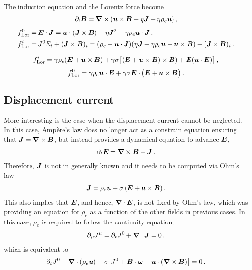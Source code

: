 \documentclass{article}
\begin{document}
The induction equation and the Lorentz force become
\begin{equation}
    \partial_t \BB = \nab \times (\uu \times \BB - \eta \JJ + \eta \rho_e \uu)\,,
\end{equation}
\begin{align}
    f_{\rm Lor}^0 = &\, \EE \cdot \JJ = \uu \cdot (\JJ \times \BB) +
    \eta \JJ^2 - \eta \rho_e \uu \cdot \JJ\,, \\ 
    f_{\rm Lor}^i = &\, J^0 E_i + (\JJ \times \BB)_i
    = (\rho_e + \uu \cdot \JJ) (\eta \JJ - \eta \rho_e \uu - \uu \times \BB)
    + (\JJ \times \BB)_i \,.
\end{align}

\begin{equation}
    f_{\rm Lor}^i = \gamma \rho_e 
    (\EE + \uu \times \BB) + \gamma \sigma \bigl[(\EE + \uu \times \BB) \times \BB ) + \EE (\uu \cdot \EE) \bigr]\,,
\end{equation}
\begin{equation}
    f_{\rm Lor}^0 = \gamma \rho_e \uu \cdot \EE + \gamma \sigma 
    \EE \cdot 
    \bigl(\EE + \uu \times \BB \bigr)\,.
\end{equation}

\subsection{Displacement current}

More interesting is the case when the displacement current cannot be neglected.
In this case, Amp\`ere's law does no longer act as a constrain equation ensuring
that $\JJ = \nab \times \BB$, but instead provides a dynamical equation
to advance $\EE$,
\begin{equation}
    \partial_t \EE = \nab \times \BB - \JJ\,.
\end{equation}
Therefore, $\JJ$ is not in generally known and it needs to be computed via Ohm's law
\begin{equation}
    \JJ = \rho_e \uu +  \sigma \, (\EE + \uu \times \BB)\,.
\end{equation}
This also implies that $\EE$, and hence, $\nab \cdot \EE$,
is not fixed by Ohm's law, which was providing an equation for $\rho_e$
as a function
of the other fields in previous cases.
In this case, $\rho_e$ is required to follow the continuity equation,
\begin{equation}
    \partial_\mu J^\mu = \partial_t J^0 + \nab \cdot \JJ = 0\,,
\end{equation}
which is equivalent to
\begin{equation}
    \partial_t J^0 + \nab \cdot (\rho_e \uu) +
    \sigma \bigl[J^0 + \BB \cdot \oom - \uu \cdot (\nab \times \BB) \bigr]
    = 0 \,.
\end{equation}
\end{document}
